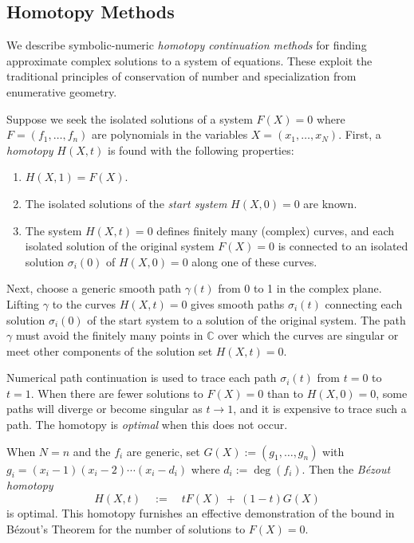 \subsection{Homotopy Methods}
We describe symbolic-numeric 
{\it homotopy continuation methods} 
for finding approximate complex solutions to a system of
equations.
These exploit the traditional principles of conservation of number and 
specialization from enumerative geometry.

Suppose we seek the isolated solutions of a system $F(X)=0$
where $F=(f_1,\ldots,f_n)$ are polynomials in the variables
$X=(x_1,\ldots,x_N)$.
First, a {\em homotopy} $H(X,t)$ is found with the following properties:
\begin{enumerate}
  \item $H(X,1)= F(X)$. 
  \item The isolated solutions of the {\it start system} $H(X,0)=0$ are known.
  \item The system $H(X,t)=0$ defines finitely many (complex) curves, 
        and each isolated solution of the original system $F(X)=0$ is
        connected to an isolated solution $\sigma_i(0)$ of $H(X,0)=0$ along
        one of these curves. 
\end{enumerate}
Next, choose a generic smooth path $\gamma(t)$ from 0 to 1 in the complex
plane.
Lifting $\gamma$ to the curves $H(X,t)=0$ gives 
smooth paths $\sigma_i(t)$ connecting each solution
$\sigma_i(0)$ of the start system to a solution of the original system.
The path $\gamma$ must avoid the finitely many points in ${\mathbb C}$ over
which the curves are singular or meet other components of the solution set
$H(X,t)=0$.

Numerical path continuation is used to trace each path
$\sigma_i(t)$ from $t=0$ to $t=1$.
When there are fewer solutions to $F(X)=0$ than to 
$H(X,0)=0$, some paths will diverge or become singular as
$t\rightarrow 1$, and it is expensive to trace such a path.
The homotopy is {\it optimal} when this does not
occur. 

When $N=n$ and the $f_i$ are generic, set
$G(X):=(g_1,\ldots,g_n)$ with $g_i=(x_i-1)(x_i-2)\cdots(x_i-d_i)$
where $d_i:=\deg(f_i)$.
Then the {\it B\'ezout homotopy} 
$$
  H(X,t)\quad :=\quad tF(X)\ +\ 
  (1-t)G(X)
$$
is optimal.
This homotopy furnishes an effective demonstration of
the bound in B\'ezout's Theorem for the number of
solutions to $F(X)=0$.

